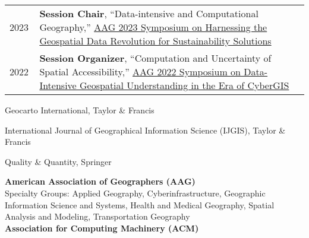 \documentclass{acmcv}
\begin{document}
\begin{longtable}{p{0.1\linewidth} p{0.9\linewidth}}
        2023 & \textbf{Session Chair}, ``Data-intensive and Computational Geography,'' \href{https://iguide.illinois.edu/aag-2023-symposium-on-harnessing-the-geospatial-data-revolution-for-sustainability-solutions/}{AAG 2023 Symposium on Harnessing the Geospatial Data Revolution for Sustainability Solutions}\\

        2022 & \textbf{Session Organizer}, ``Computation and Uncertainty of Spatial Accessibility,'' \href{https://cybergis.illinois.edu/aag-symposium-2022/}{AAG 2022 Symposium on Data-Intensive Geospatial Understanding in the Era of CyberGIS}\\
    \end{longtable}

    \vspace*{0.25cm}
    \begin{titemize}
        \item Geocarto International, Taylor \& Francis
        \item International Journal of Geographical Information Science (IJGIS), Taylor \& Francis
        \item Quality \& Quantity, Springer
    \end{titemize}



    \vspace*{0.5cm}
\vspace*{.3cm}

    \textbf{American Association of Geographers (AAG)} \\
    Specialty Groups: Applied Geography, Cyberinfrastructure, Geographic Information Science and Systems, Health and Medical Geography, Spatial Analysis and Modeling, Transportation Geography \\

    \textbf{Association for Computing Machinery (ACM)}
\end{document}
